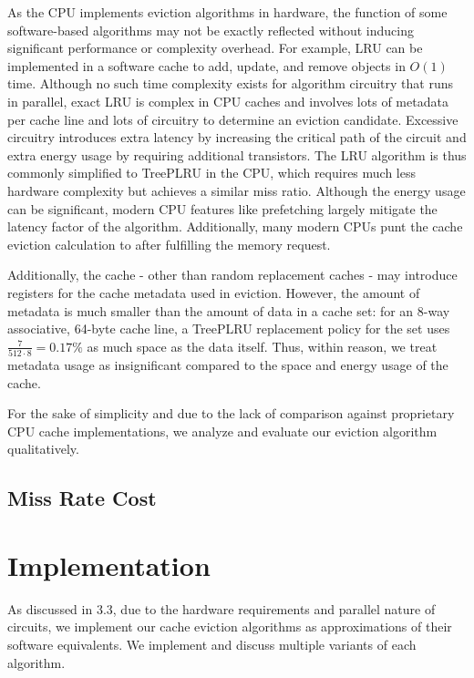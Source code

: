 \documentclass[letterpaper, twocolumn]{article}
\begin{document}
As the CPU implements eviction algorithms in hardware, the function of some software-based algorithms
may not be exactly reflected without inducing significant performance or complexity overhead.
For example, LRU can be implemented in a software cache to add, update, and remove objects in $O(1)$ time.
Although no such time complexity exists for algorithm circuitry that runs in parallel,
exact LRU is complex in CPU caches and involves lots of metadata per cache line and lots of circuitry to
determine an eviction candidate.
Excessive circuitry introduces extra latency by increasing the critical path of the circuit
and extra energy usage by requiring additional transistors.
The LRU algorithm is thus commonly simplified to TreePLRU in the CPU, which requires much less hardware complexity
but achieves a similar miss ratio.
Although the energy usage can be significant, modern CPU features like prefetching largely mitigate the latency factor of the algorithm.
Additionally, many modern CPUs punt the cache eviction calculation to after fulfilling the memory request.

Additionally, the cache - other than random replacement caches - may introduce registers for the cache metadata used in eviction.
However, the amount of metadata is much smaller than the amount of data in a cache set:
for an 8-way associative, 64-byte cache line, a TreePLRU replacement policy for the set uses
$\frac{7}{512 \cdot 8}=0.17\%$ as much space as the data itself.
Thus, within reason, we treat metadata usage as insignificant compared to the space and energy usage of the cache.

For the sake of simplicity and due to the lack of comparison against proprietary CPU cache implementations,
we analyze and evaluate our eviction algorithm qualitatively.

\subsection{Miss Rate Cost}

\section{Implementation}

As discussed in 3.3, due to the hardware requirements and parallel nature of circuits,
we implement our cache eviction algorithms as approximations of their software equivalents.
We implement and discuss multiple variants of each algorithm.
\end{document}
